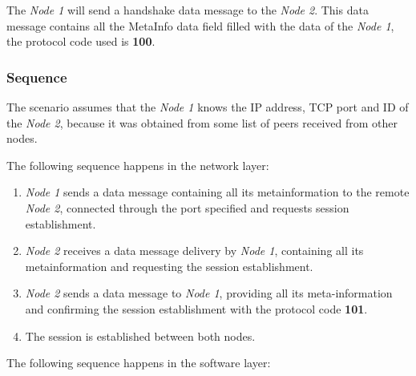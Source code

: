 The \emph{Node 1} will send a handshake data message to the \emph{Node 2}. This data message contains all the MetaInfo data field filled with the data of the \emph{Node 1}, the protocol code used is \textbf{100}.

\subsubsection{Sequence}

The scenario assumes that the \emph{Node 1} knows the \gls{IP} address, \gls{TCP} port and ID of the \emph{Node 2}, because it was obtained from some list of peers received from other nodes.

The following sequence happens in the network layer:

\begin{enumerate}

\item \emph{Node 1} sends a data message  containing all its metainformation to the remote \emph{Node 2}, connected through the port specified and requests session establishment.

\item \emph{Node 2} receives a data message delivery by \emph{Node 1}, containing all its metainformation and requesting the session establishment.

\item \emph{Node 2} sends a data message to \emph{Node 1}, providing all its meta-information and confirming the session establishment with the protocol code \textbf{101}.

\item The session is established between both nodes.

\end{enumerate}

The following sequence happens in the software layer:

